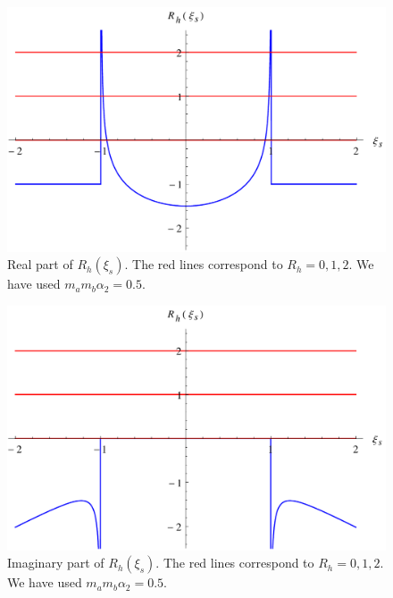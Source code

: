 \begin{figure}
\centering
\includegraphics[scale=0.6]{Plots/ReRh.pdf}
\caption[Real part of the Regge trajectory function for the massless symmetric tensor exchange model]{Real part of $R_{h}(\xi_{s})$. The red lines correspond to $R_{h} = 0, 1, 2$. We have used $m_{a} m_{b} \alpha_{2} = 0.5$.}
\label{ReRhFig}
\end{figure}

\begin{figure}
\centering
\includegraphics[scale=0.6]{Plots/ImRh.pdf}
\caption[Imaginary part of the Regge trajectory function for the massless symmetric tensor exchange model]{Imaginary part of $R_{h}(\xi_{s})$. The red lines correspond to $R_{h} = 0, 1, 2$. We have used $m_{a} m_{b} \alpha_{2} = 0.5$.}
\label{ImRhFig}
\end{figure}

